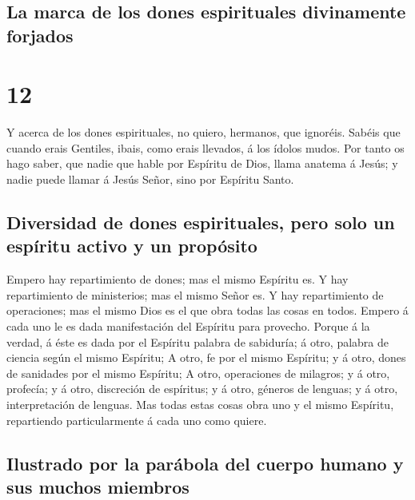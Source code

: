 \hypertarget{la-marca-de-los-dones-espirituales-divinamente-forjados}{%
\subsection{La marca de los dones espirituales divinamente
forjados}\label{la-marca-de-los-dones-espirituales-divinamente-forjados}}

\hypertarget{section-46-12}{%
\section{12}\label{section-46-12}}

 Y acerca de los dones espirituales, no quiero, hermanos,
que ignoréis.  Sabéis que cuando erais Gentiles, ibais,
como erais llevados, á los ídolos mudos.  Por tanto os
hago saber, que nadie que hable por Espíritu de Dios, llama anatema á
Jesús; y nadie puede llamar á Jesús Señor, sino por Espíritu Santo.

\hypertarget{diversidad-de-dones-espirituales-pero-solo-un-espuxedritu-activo-y-un-propuxf3sito}{%
\subsection{Diversidad de dones espirituales, pero solo un espíritu
activo y un
propósito}\label{diversidad-de-dones-espirituales-pero-solo-un-espuxedritu-activo-y-un-propuxf3sito}}

 Empero hay repartimiento de dones; mas el mismo Espíritu
es.  Y hay repartimiento de ministerios; mas el mismo
Señor es.  Y hay repartimiento de operaciones; mas el
mismo Dios es el que obra todas las cosas en todos. 
Empero á cada uno le es dada manifestación del Espíritu para provecho.
 Porque á la verdad, á éste es dada por el Espíritu
palabra de sabiduría; á otro, palabra de ciencia según el mismo
Espíritu;  A otro, fe por el mismo Espíritu; y á otro,
dones de sanidades por el mismo Espíritu;  A otro,
operaciones de milagros; y á otro, profecía; y á otro, discreción de
espíritus; y á otro, géneros de lenguas; y á otro, interpretación de
lenguas.  Mas todas estas cosas obra uno y el mismo
Espíritu, repartiendo particularmente á cada uno como quiere.

\hypertarget{ilustrado-por-la-paruxe1bola-del-cuerpo-humano-y-sus-muchos-miembros}{%
\subsection{Ilustrado por la parábola del cuerpo humano y sus muchos
miembros}\label{ilustrado-por-la-paruxe1bola-del-cuerpo-humano-y-sus-muchos-miembros}}

